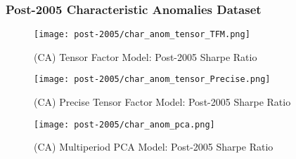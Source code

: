 \subsubsection{Post-2005 Characteristic Anomalies Dataset}

\begin{figure}[H]
    \centering
    \texttt{[image: post-2005/char\_anom\_tensor\_TFM.png]}
    \caption{(CA) Tensor Factor Model: Post-2005 Sharpe Ratio}
    \label{fig:char_anom-post-2005-tfm}
\end{figure}

\begin{figure}[H]
    \centering
    \texttt{[image: post-2005/char\_anom\_tensor\_Precise.png]}
    \caption{(CA) Precise Tensor Factor Model: Post-2005 Sharpe Ratio}
    \label{fig:char_anom-post-2005-precise}
\end{figure}


\begin{figure}[H]
    \centering
    \texttt{[image: post-2005/char\_anom\_pca.png]}
    \caption{(CA) Multiperiod PCA Model: Post-2005 Sharpe Ratio}
    \label{fig:char_anom-post-2005-pca}
\end{figure}
